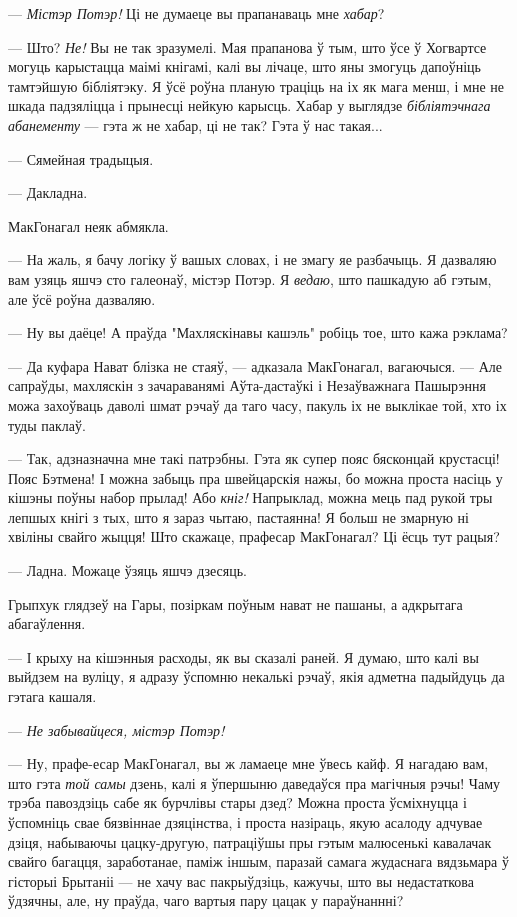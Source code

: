 --- \emph{Містэр Потэр!} Ці не думаеце вы прапанаваць мне  \emph{хабар}?

--- Што? \emph{Не!} Вы не так зразумелі. Мая прапанова ў тым, што ўсе ў Хогвартсе могуць
карыстацца маімі кнігамі, калі вы лічаце, што яны змогуць дапоўніць тамтэйшую бібліятэку.
Я ўсё роўна планую траціць на іх як мага менш, і мне не шкада падзяліцца і прынесці нейкую
карысць. Хабар у выглядзе \emph{бібліятэчнага абанементу} --- гэта ж не хабар, ці не так?
Гэта ў нас такая...

--- Сямейная традыцыя.

--- Дакладна.

МакГонагал неяк абмякла. 

--- На жаль, я бачу логіку ў вашых словах, і не змагу яе разбачыць. Я дазваляю вам узяць яшчэ
сто галеонаў, містэр Потэр. Я \emph{ведаю}, што пашкадую аб гэтым, але ўсё роўна дазваляю.

--- Ну вы даёце! А праўда "Махляскінавы кашэль" робіць тое, што кажа рэклама?

--- Да куфара Нават блізка не стаяў, --- адказала МакГонагал, вагаючыся. --- Але 
сапраўды, махляскін
з зачараванямі Аўта-дастаўкі і Незаўважнага Пашырэння можа захоўваць
даволі шмат
рэчаў да таго часу, пакуль іх не выклікае той, хто іх туды паклаў.

--- Так, адзназначна мне такі патрэбны. Гэта як супер пояс бясконцай крустасці! Пояс Бэтмена!
І можна забыць пра швейцарскія нажы, бо можна проста насіць у кішэны поўны набор прылад!
Або \emph{кніг!} Напрыклад, можна мець пад рукой тры лепшых кнігі з тых, што я зараз
чытаю, пастаянна! Я больш не змарную ні хвіліны свайго жыцця! Што скажаце, прафесар
МакГонагал? Ці ёсць тут рацыя?

--- Ладна. Можаце ўзяць яшчэ дзесяць.

Грыпхук глядзеў на Гары, позіркам поўным нават не пашаны, а адкрытага абагаўлення.

--- І крыху на кішэнныя расходы, як вы сказалі раней. Я думаю, што калі вы выйдзем на вуліцу,
я адразу ўспомню некалькі рэчаў, якія адметна падыйдуць да гэтага кашаля.

--- \emph{Не забывайцеся, містэр Потэр!}


--- Ну, прафе-есар МакГонагал, вы ж ламаеце мне ўвесь кайф. Я нагадаю вам, што гэта \emph{той самы}
дзень, калі я ўпершыню даведаўся пра магічныя рэчы! Чаму трэба павоздзіць сабе як бурчлівы
стары дзед? Можна проста ўсміхнуцца і ўспомніць свае бязвіннае дзяцінства, і проста назіраць,
якую асалоду адчувае дзіця, набываючы цацку-другую, патраціўшы пры гэтым малюсенькі
кавалачак свайго багацця, заработанае, паміж іншым, паразай самага жудаснага вядзьмара ў 
гісторыі Брытаніі --- не хачу вас пакрыўдзіць, кажучы, што вы недастаткова ўдзячны, 
але, ну праўда, чаго вартыя пару цацак у параўнаннні?

